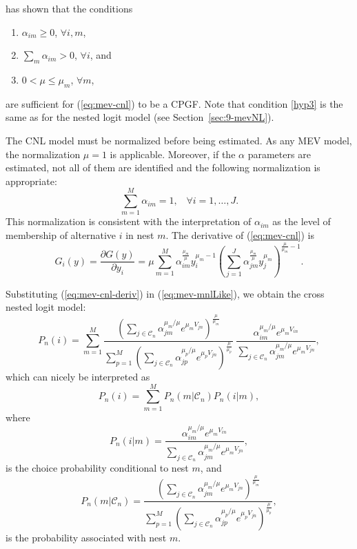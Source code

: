 \documentclass[12pt,a4paper]{article}
\newcommand{\req}[1]{(\ref{#1})}
\begin{document}
 has shown that the conditions
\begin{enumerate}
\item\label{hyp1} $\alpha_{im} \geq 0$, $\forall i,m$,
\item\label{hyp2} $\sum_m \alpha_{im} > 0$, $\forall i$, and
\item\label{hyp3} $0 < \mu \leq \mu_m$, $\forall m$,
\end{enumerate}
 are sufficient for \req{eq:mev-cnl} to be a CPGF.
Note that condition \ref{hyp3} is the same as for the nested logit
model (see Section~\ref{sec:9-mevNL}). 

The CNL model must be normalized before being estimated. As any MEV model, the normalization $\mu=1$ is applicable. Moreover, if the $\alpha$ parameters are estimated, not all of them  are identified and the following normalization is
appropriate:
\begin{equation}
\label{eq:sumAlphaNormalized}
\sum_{m=1}^M \alpha_{im} = 1, \;\;\; \forall i=1,\ldots,J.
\end{equation}
This normalization is consistent with the interpretation of $\alpha_{im}$ as the level of membership of alternative $i$ in nest $m$. 
The derivative of \req{eq:mev-cnl} is
\begin{equation}
\label{eq:mev-cnl-deriv}
G_i(y) = \frac{\partial G(y)}{\partial y_i} = \mu  \sum_{m=1}^M \alpha_{im}^{\frac{\mu_m}{\mu}} y_i^{\mu_m-1}\left( \sum_{j=1}^{J} \alpha_{jm}^{\frac{\mu_m}{\mu}} y_j^{\mu_m} \right)^{\frac{\mu}{\mu_m}-1}.
\end{equation}


Substituting \req{eq:mev-cnl-deriv} in \req{eq:mev-mnlLike}, we obtain the
cross nested logit model:
\begin{equation}
\label{eq:CNLmodel}
P_n(i)  = \sum_{m=1}^M \frac{\left(\sum_{j\in\mathcal{C}_n}{\alpha_{jm}^{\mu_m/\mu} e^{\mu_m V_{jn}}}\right)^{\frac{\mu}{\mu_m}}}{\sum_{p=1}^M \left(\sum_{j\in\mathcal{C}_n}{\alpha_{jp}^{\mu_p/\mu} e^{\mu_p V_{jn}}}\right)^{\frac{\mu}{\mu_p}}} \; \frac{\alpha_{im}^{\mu_m/\mu}e^{\mu_m V_{in}}}{\sum_{j\in\mathcal{C}_n} \alpha_{jm}^{\mu_m/\mu}e^{\mu_m V_{jn}}},
\end{equation}
which can nicely be interpreted as
\begin{equation}
P_n(i) = \sum_{m=1}^M P_n(m|\mathcal{C}_n) P_n(i|m),
\end{equation}
where
\begin{equation}
P_n(i|m) = \frac{\alpha_{im}^{\mu_m/\mu}e^{\mu_m V_{in}}}{\sum_{j\in\mathcal{C}_n} \alpha_{jm}^{\mu_m/\mu}e^{\mu_m V_{jn}}},
\end{equation}
is the choice probability conditional to nest $m$, and
\begin{equation}
P_n(m|\mathcal{C}_n) = \frac{\left(\sum_{j\in\mathcal{C}_n}{\alpha_{jm}^{\mu_m/\mu} e^{\mu_m V_{jn}}}\right)^{\frac{\mu}{\mu_m}}}{\sum_{p=1}^M \left(\sum_{j\in\mathcal{C}_n}{\alpha_{jp}^{\mu_p/\mu} e^{\mu_p V_{jn}}}\right)^{\frac{\mu}{\mu_p}}},
\end{equation}
is the probability associated with nest $m$.
\end{document}
